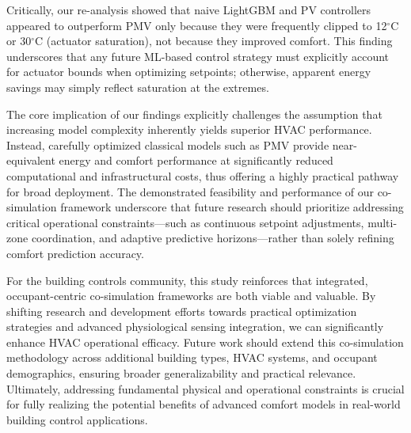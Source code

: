 Critically, our re-analysis showed that naive LightGBM and PV controllers appeared to outperform PMV only because they were frequently clipped to 12$^\circ$C or 30$^\circ$C (actuator saturation), not because they improved comfort.
This finding underscores that any future ML-based control strategy must explicitly account for actuator bounds when optimizing setpoints; otherwise, apparent energy savings may simply reflect saturation at the extremes.

The core implication of our findings explicitly challenges the assumption that increasing model complexity inherently yields superior HVAC performance. Instead, carefully optimized classical models such as PMV provide near-equivalent energy and comfort performance at significantly reduced computational and infrastructural costs, thus offering a highly practical pathway for broad deployment. The demonstrated feasibility and performance of our co-simulation framework underscore that future research should prioritize addressing critical operational constraints—such as continuous setpoint adjustments, multi-zone coordination, and adaptive predictive horizons—rather than solely refining comfort prediction accuracy.

For the building controls community, this study reinforces that integrated, occupant-centric co-simulation frameworks are both viable and valuable. By shifting research and development efforts towards practical optimization strategies and advanced physiological sensing integration, we can significantly enhance HVAC operational efficacy. Future work should extend this co-simulation methodology across additional building types, HVAC systems, and occupant demographics, ensuring broader generalizability and practical relevance. Ultimately, addressing fundamental physical and operational constraints is crucial for fully realizing the potential benefits of advanced comfort models in real-world building control applications.

\newpage
